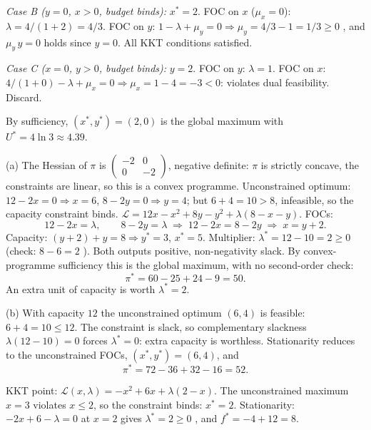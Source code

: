 \begin{solutions}
        \emph{Case B ($y = 0$, $x > 0$, budget binds):} $x^* = 2$. FOC on
        $x$ ($\mu_x = 0$): $\lambda = 4/(1 + 2) = 4/3$. FOC on $y$:
        $1 - \lambda + \mu_y = 0 \Rightarrow \mu_y = 4/3 - 1 = 1/3 \geq 0$
        \checkmark, and $\mu_y\,y = 0$ holds since $y = 0$. All KKT
        conditions satisfied.

        \emph{Case C ($x = 0$, $y > 0$, budget binds):} $y = 2$. FOC on
        $y$: $\lambda = 1$. FOC on $x$:
        $4/(1 + 0) - \lambda + \mu_x = 0 \Rightarrow \mu_x = 1 - 4 = -3
        < 0$: violates dual feasibility. Discard.

        By sufficiency, $(x^*, y^*) = (2, 0)$ is the global maximum with
        $U^* = 4 \ln 3 \approx 4.39$.

  \item (a) The Hessian of $\pi$ is
        $\begin{pmatrix} -2 & 0 \\ 0 & -2 \end{pmatrix}$, negative
        definite: $\pi$ is strictly concave, the constraints are linear,
        so this is a convex programme. Unconstrained optimum:
        $12 - 2 x = 0 \Rightarrow x = 6$,
        $8 - 2 y = 0 \Rightarrow y = 4$; but $6 + 4 = 10 > 8$, infeasible,
        so the capacity constraint binds.
        $\mathcal{L} = 12 x - x^2 + 8 y - y^2 + \lambda(8 - x - y)$. FOCs:
        \[
          12 - 2 x = \lambda, \qquad 8 - 2 y = \lambda
          \;\Rightarrow\; 12 - 2 x = 8 - 2 y
          \;\Rightarrow\; x = y + 2 .
        \]
        Capacity: $(y + 2) + y = 8 \Rightarrow y^* = 3$, $x^* = 5$.
        Multiplier: $\lambda^* = 12 - 10 = 2 \geq 0$ \checkmark (check:
        $8 - 6 = 2$ \checkmark). Both outputs positive, non-negativity
        slack. By convex-programme sufficiency this is the global maximum,
        with no second-order check:
        \[
          \pi^* = 60 - 25 + 24 - 9 = 50 .
        \]
        An extra unit of capacity is worth $\lambda^* = 2$.

        (b) With capacity $12$ the unconstrained optimum $(6, 4)$ is
        feasible: $6 + 4 = 10 \leq 12$. The constraint is slack, so
        complementary slackness $\lambda(12 - 10) = 0$ forces
        $\lambda^* = 0$: extra capacity is worthless. Stationarity reduces
        to the unconstrained FOCs, $(x^*, y^*) = (6, 4)$, and
        \[
          \pi^* = 72 - 36 + 32 - 16 = 52 .
        \]

  \item KKT point: $\mathcal{L}(x, \lambda) = -x^2 + 6 x + \lambda(2 - x)$.
        The unconstrained maximum $x = 3$ violates $x \leq 2$, so the
        constraint binds: $x^* = 2$. Stationarity:
        $-2 x + 6 - \lambda = 0$ at $x = 2$ gives
        $\lambda^* = 2 \geq 0$ \checkmark, and $f^* = -4 + 12 = 8$.


\end{solutions}
